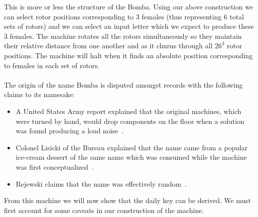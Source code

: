 \noindent This is more or less the structure of the Bomba. Using our
above construction we can select rotor positions corresponding to 3
females (thus representing 6 total sets of rotors) and we can select
an input letter which we expect to produce these 3 females. The
machine rotates all the rotors simultaneously so they maintain their
relative distance from one another and as it churns through all
$26^3$ rotor positions. The machine will halt when it finds an
absolute position corresponding to females in each set of rotors.
\\\\The
origin of the name Bomba is disputed amongst records with the
following claims to its namesake:
\begin{itemize}
  \item A United States Army report explained that the original
    machines, which were turned by hand, would drop components on the
    floor when a solution was found producing a loud noise~\cite[p.~10]{usBombeReport1944}.
  \item Colonel Lisicki of the Bureau explained that
    the name came from a popular ice-cream dessert of the same name
    which was consumed while the machine was first conceptualized~\cite[p.~63]{KozaczukEnigma1984}.
  \item Rejewski claims that the name was effectively random~\cite[p.~226]{Rejewski1981}.
\end{itemize}
From this machine we will now show that the daily key can be derived.
We must first account for some caveats in our construction of the machine.

